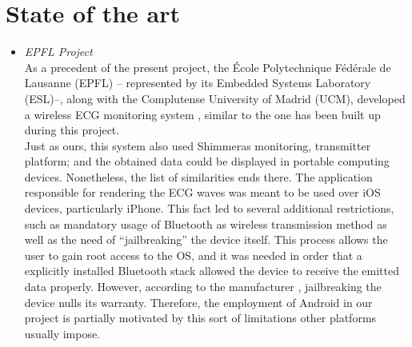 	\section{State of the art}
	\label{sec:prj-sota}
		\begin{itemize}


			\item \emph{EPFL Project}\\
				As a precedent of the present project, the École Polytechnique Fédérale de Lausanne (EPFL) --
				represented by its Embedded Systems Laboratory (ESL)--, along with the Complutense University 
				of Madrid (UCM), developed a wireless ECG monitoring system \cite{ESL}, similar to the one has been built 
				up during this project.\\

				Just as ours, this system also used Shimmer\texttrademark as monitoring, transmitter platform;
				and the obtained data could be displayed in portable computing devices.
				Nonetheless, the list of similarities ends there. The application responsible for rendering
				the ECG waves was meant to be used over iOS devices, particularly iPhone. This fact led to several
				additional restrictions, such as mandatory usage of Bluetooth as wireless transmission method as
				well as the need of ``jailbreaking'' the device itself. This process allows the user to gain root access to
				the OS, and it was needed in order that a explicitly installed Bluetooth stack allowed the device to 
				receive the emitted data properly. However, according to the manufacturer \cite{AppleJB}, jailbreaking 
				the device nulls its warranty. Therefore, the employment of Android in our project is partially motivated 
				by this sort of limitations other platforms usually impose.\\


\end{itemize}
